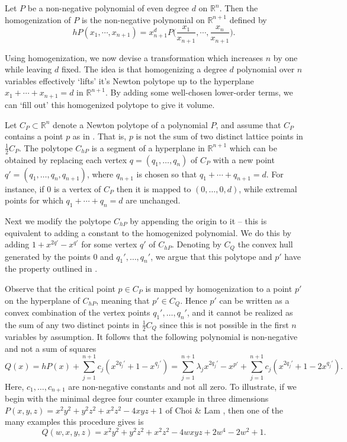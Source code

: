 \documentclass[oneside,hidelinks,indentfirst,10pt]{book}
\begin{document}
\begin{defn}
Let \(P\) be a non-negative polynomial of even degree \(d\) on \(\mathbb{R}^n\). Then the homogenization of \(P\) is the non-negative polynomial on \(\mathbb{R}^{n+1}\) defined by
\[
    hP(x_1,\cdots,x_{n+1})=x_{n+1}^dP\bigg(\frac{x_1}{x_{n+1}},\cdots,\frac{x_n}{x_{n+1}}\bigg).
\]
\end{defn}


Using homogenization, we now devise a transformation which increases \(n\) by one while leaving \(d\) fixed. The idea is that homogenizing a degree \(d\) polynomial over \(n\) variables effectively `lifts' it's Newton polytope up to the hyperplane \(x_1+\cdots+x_{n+1}=d\) in \(\mathbb{R}^{n+1}\). By adding some well-chosen lower-order terms, we can `fill out' this homogenized polytope to give it volume.

Let \(C_P\subset\mathbb{R}^n\) denote a Newton polytope of a polynomial \(P\), and assume that \(C_P\) contains a point \(p\) as in . That is, \(p\) is not the sum of two distinct lattice points in \(\frac{1}{2}C_P\). The polytope \(C_{hP}\) is a segment of a hyperplane in \(\mathbb{R}^{n+1}\) which can be obtained by replacing each vertex \(q=(q_1,\dots,q_n)\) of \(C_P\) with a new point \(q'=(q_1,\dots,q_n,q_{n+1})\), where \(q_{n+1}\) is chosen so that \(q_1+\cdots+q_{n+1}=d\). For instance, if \(0\) is a vertex of \(C_P\) then it is mapped to \((0,\dots,0,d)\), while extremal points for which \(q_1+\cdots+q_n=d\) are unchanged. 


Next we modify the polytope \(C_{hP}\) by appending the origin to it -- this is equivalent to adding a constant to the homogenized polynomial. We do this by adding \(1+x^{2q'}-x^{q'}\) for some vertex \(q'\) of \(C_{hP}\). Denoting by \(C_Q\) the convex hull generated by the points \(0\) and \(q_1',\dots,q_n'\), we argue that this polytope and \(p'\) have the property outlined in .

Observe that the critical point \(p\in C_P\) is mapped by homogenization to a point \(p'\) on the hyperplane of \(C_{hP}\), meaning that \(p'\in C_Q\). Hence \(p'\) can be written as a convex combination of the vertex points \(q_1',\dots,q_n'\), and it cannot be realized as the sum of any two distinct points in \(\frac{1}{2}C_Q\) since this is not possible in the first \(n\) variables by assumption. It follows that the following polynomial is non-negative and not a sum of squares
\[
    Q(x)=hP(x)+\sum_{j=1}^{n+1}c_j(x^{2q_j'}+1-x^{q_j'})=\sum_{j=1}^{n+1}\lambda_jx^{2q_j'}-x^{p'}+\sum_{j=1}^{n+1}c_j(x^{2q_j'}+1-2x^{q_j'}).
\]
Here, \(c_1,\dots,c_{n+1}\) are non-negative constants and not all zero. To illustrate, if we begin with the minimal degree four counter example in three dimensions \(P(x,y,z)=x^2y^2+y^2z^2+x^2z^2-4xyz+1\) of Choi \& Lam \cite{CL2}, then one of the many examples this procedure gives  is
\[
    Q(w,x,y,z)=x^2y^2+y^2z^2+x^2z^2-4wxyz+2w^4-2w^2+1.
\]
\end{document}
